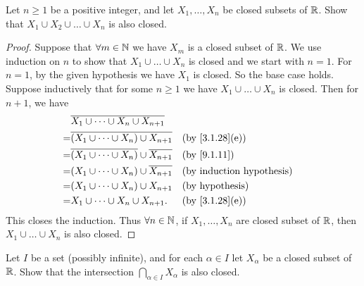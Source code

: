\begin{ex}\label{ex:9.1.7}
  Let \(n \geq 1\) be a positive integer, and let \(X_1, \dots, X_n\) be closed subsets of \(\mathbb{R}\).
  Show that \(X_1 \cup X_2 \cup \dots \cup X_n\) is also closed.
\end{ex}

\begin{proof}
  Suppose that \(\forall m \in \mathbb{N}\) we have \(X_m\) is a closed subset of \(\mathbb{R}\).
  We use induction on \(n\) to show that \(X_1 \cup \dots \cup X_n\) is closed and we start with \(n = 1\).
  For \(n = 1\), by the given hypothesis we have \(X_1\) is closed.
  So the base case holds.
  Suppose inductively that for some \(n \geq 1\) we have \(X_1 \cup \dots \cup X_n\) is closed.
  Then for \(n + 1\), we have
  \begin{align*}
      & \overline{X_1 \cup \dots \cup X_n \cup X_{n + 1}}                                                \\
    = & \overline{(X_1 \cup \dots \cup X_n) \cup X_{n + 1}}            &  & \text{(by \cref{3.1.28}(e))} \\
    = & \overline{(X_1 \cup \dots \cup X_n)} \cup \overline{X_{n + 1}} &  & \by{9.1.11}                  \\
    = & (X_1 \cup \dots \cup X_n) \cup \overline{X_{n + 1}}            &  & \byIH                        \\
    = & (X_1 \cup \dots \cup X_n) \cup X_{n + 1}                       &  & \text{(by hypothesis)}       \\
    = & X_1 \cup \dots \cup X_n \cup X_{n + 1}.                        &  & \text{(by \cref{3.1.28}(e))}
  \end{align*}
  This closes the induction.
  Thus \(\forall n \in \mathbb{N}\), if \(X_1, \dots, X_n\) are closed subset of \(\mathbb{R}\), then \(X_1 \cup \dots \cup X_n\) is also closed.
\end{proof}

\begin{ex}\label{ex:9.1.8}
  Let \(I\) be a set (possibly infinite), and for each \(\alpha \in I\) let \(X_{\alpha}\) be a closed subset of \(\mathbb{R}\).
  Show that the intersection \(\bigcap_{\alpha \in I} X_{\alpha}\) is also closed.
\end{ex}

